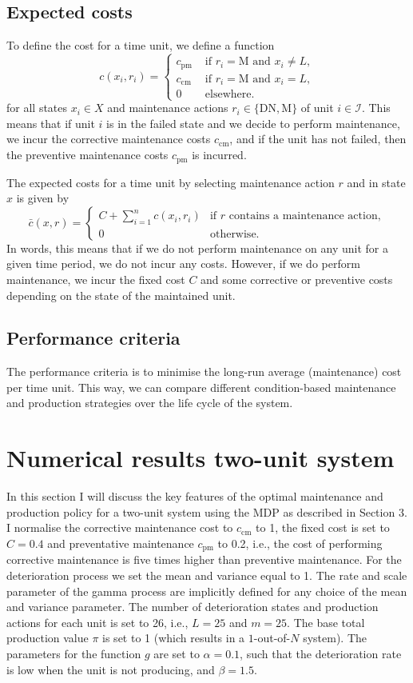 \documentclass[a4paper,12pt]{article}
\begin{document}
\subsection{Expected costs}
To define the cost for a time unit, we define a function
$$
c(x_i,r_i) = \begin{cases}
c_{\text{pm}} & \text{ if } r_i = \text{M} \text{ and } x_i \neq L, \\
c_{\text{cm}} & \text{ if } r_i = \text{M} \text{ and } x_i = L, \\
0 & \text{ elsewhere}.
\end{cases}
$$
for all states $x_i \in X$ and maintenance actions $r_i \in \{\text{DN}, \text{M}\}$ of unit $i \in \mathcal{I}$. This means that if unit $i$ is in the failed state and we decide to perform maintenance, we incur the corrective maintenance costs $c_{\text{cm}}$, and if the unit has not failed, then the preventive maintenance costs $c_{\text{pm}}$ is incurred. 

The expected costs for a time unit by selecting maintenance action $r$ and in state $x$ is given by
$$
\bar{c}(x,r) = \begin{cases}
C + \sum_{i=1}^{n}c(x_i, r_i) &\text{if } r \text{ contains a maintenance action},\\
0 &\text{otherwise}.
\end{cases}
$$
In words, this means that if we do not perform maintenance on any unit for a given time period, we do not incur any costs. However, if we do perform maintenance, we incur the fixed cost $C$ and some corrective or preventive costs depending on the state of the maintained unit.
\subsection{Performance criteria}
The performance criteria is to minimise the long-run average (maintenance) cost per time unit. This way, we can compare different condition-based maintenance and production strategies over the life cycle of the system.

\section{Numerical results two-unit system}
In this section I will discuss the key features of the optimal maintenance and production policy for a two-unit system using the MDP as described in Section 3. I normalise the corrective maintenance cost to $c_\text{cm}$ to 1, the fixed cost is set to $C = 0.4$ and preventative maintenance $c_\text{pm}$ to 0.2, i.e., the cost of performing corrective maintenance is five times higher than preventive maintenance. For the deterioration process we set the mean and variance equal to 1. The rate and scale parameter of the gamma process are implicitly defined for any choice of the mean and variance parameter. The number of deterioration states and production actions for each unit is set to 26, i.e., $L = 25$ and $m = 25$. The base total production value $\pi$ is set to 1 (which results in a $1$-out-of-$N$ system). The parameters for the function $g$ are set to $\alpha = 0.1$, such that the deterioration rate is low when the unit is not producing, and $\beta = 1.5$. 
\end{document}
